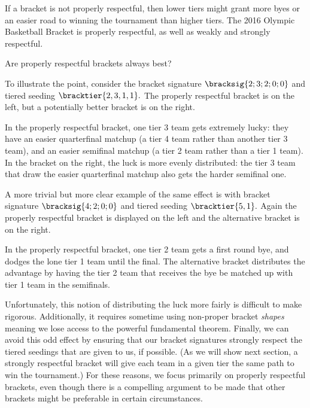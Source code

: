 {    If a bracket is not properly respectful, then lower tiers might grant more byes or an easier road to winning the tournament than higher tiers. The 2016 Olympic Basketball Bracket is properly respectful, as well as weakly and strongly respectful.

    \begin{oq}{}{}
        Are properly respectful brackets always best?
    \end{oq}

    To illustrate the point, consider the bracket signature $\bracksig{2;3;2;0;0}$ and tiered seeding $\bracktier{2, 3, 1, 1}.$ The properly respectful bracket is on the left, but a potentially better bracket is on the right.


    In the properly respectful bracket, one tier 3 team gets extremely lucky: they have an easier quarterfinal matchup (a tier 4 team rather than another tier 3 team), and an easier semifinal matchup (a tier 2 team rather than a tier 1 team). In the bracket on the right, the luck is more evenly distributed: the tier 3 team that draw the easier quarterfinal matchup also gets the harder semifinal one.

    A more trivial but more clear example of the same effect is with bracket signature $\bracksig{4;2;0;0}$ and tiered seeding $\bracktier{5, 1}.$ Again the properly respectful bracket is displayed on the left and the alternative bracket is on the right.
    

    In the properly respectful bracket, one tier 2 team gets a first round bye, and dodges the lone tier 1 team until the final. The alternative bracket distributes the advantage by having the tier 2 team that receives the bye be matched up with tier 1 team in the semifinals.

    Unfortunately, this notion of distributing the luck more fairly is difficult to make rigorous. Additionally, it requires sometime using non-proper bracket \textit{shapes} meaning we lose access to the powerful fundamental theorem. Finally, we can avoid this odd effect by ensuring that our bracket signatures strongly respect the tiered seedings that are given to us, if possible. (As we will show next section, a strongly respectful bracket will give each team in a given tier the same path to win the tournament.) For these reasons, we focus primarily on properly respectful brackets, even though there is a compelling argument to be made that other brackets might be preferable in certain circumstances.

}